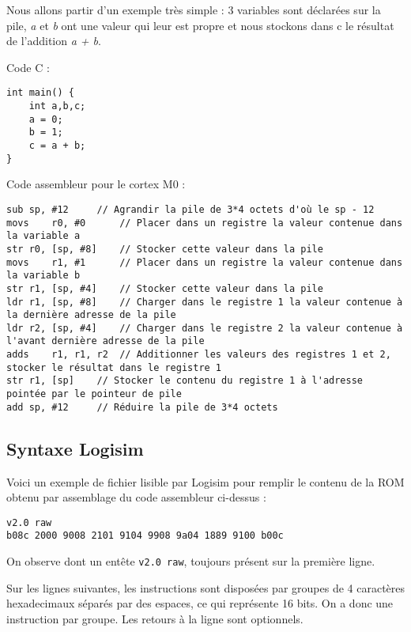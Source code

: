 \documentclass{article}
\begin{document}
    Nous allons partir d'un exemple très simple : 3 variables sont déclarées sur la pile, \textit{a} et \textit{b} ont une valeur qui leur est propre et nous stockons dans c le résultat de l'addition \textit{a + b}.
    \newline
    \begin{minipage}{\linewidth}
        Code C :
        \begin{lstlisting}
int main() {
	int a,b,c;
	a = 0;
	b = 1;
	c = a + b;
}
        \end{lstlisting}
    \end{minipage}
    \begin{center}
        \begin{minipage}{\linewidth}
            Code assembleur pour le cortex M0 :
            \begin{lstlisting}
sub	sp, #12 	// Agrandir la pile de 3*4 octets d'où le sp - 12
movs	r0, #0 		// Placer dans un registre la valeur contenue dans la variable a 
str	r0, [sp, #8]	// Stocker cette valeur dans la pile
movs	r1, #1		// Placer dans un registre la valeur contenue dans la variable b 
str	r1, [sp, #4]	// Stocker cette valeur dans la pile
ldr	r1, [sp, #8]	// Charger dans le registre 1 la valeur contenue à la dernière adresse de la pile
ldr	r2, [sp, #4]	// Charger dans le registre 2 la valeur contenue à l'avant dernière adresse de la pile
adds	r1, r1, r2	// Additionner les valeurs des registres 1 et 2, stocker le résultat dans le registre 1
str	r1, [sp]	// Stocker le contenu du registre 1 à l'adresse pointée par le pointeur de pile
add	sp, #12		// Réduire la pile de 3*4 octets
            \end{lstlisting}
        \end{minipage}
    \end{center}

    \subsection{Syntaxe Logisim}

    Voici un exemple de fichier lisible par Logisim pour remplir le contenu de la ROM obtenu par assemblage du code assembleur ci-dessus :
    \begin{lstlisting}
v2.0 raw
b08c 2000 9008 2101 9104 9908 9a04 1889 9100 b00c
    \end{lstlisting}

    On observe dont un entête \texttt{v2.0 raw}, toujours présent sur la première ligne.

    Sur les lignes suivantes, les instructions sont disposées par groupes de 4 caractères hexadecimaux séparés par des espaces, ce qui représente 16 bits.
    On a donc une instruction par groupe.
    Les retours à la ligne sont optionnels.
\end{document}

